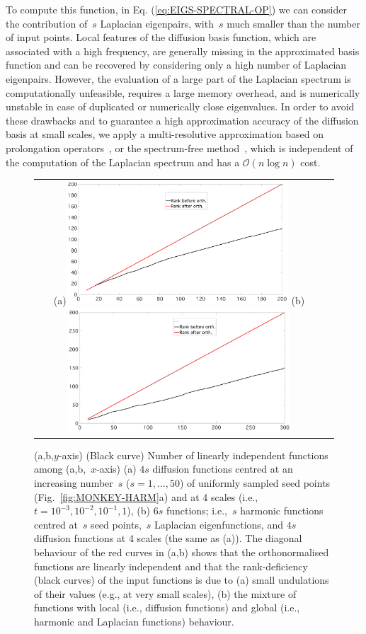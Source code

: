\documentclass[acmtog,authorversion]{acmart}
\begin{document}
To compute this function, in Eq. (\ref{eq:EIGS-SPECTRAL-OP}) we can consider the contribution of~$s$ Laplacian eigenpairs, with~$s$ much smaller than the number of input points. Local features of the diffusion basis function, which are associated with a high frequency, are generally missing in the approximated basis function and can be recovered by considering only a high number of Laplacian eigenpairs. However, the evaluation of a large part of the Laplacian spectrum is computationally unfeasible, requires a large memory overhead, and is numerically unstable in case of duplicated or numerically close eigenvalues. In order to avoid these drawbacks and to guarantee a high approximation accuracy of the diffusion basis at small scales, we apply a multi-resolutive approximation based on prolongation operators~\citep{VAXMAN2010}, or the spectrum-free method~\citep{PATANE-CAGD2013}, which is independent of the computation of the Laplacian spectrum and has a \mbox{$\mathcal{O}(n\log n)$} cost.
%
\begin{figure}[t]
\centering
\begin{tabular}{cc}
(a)\includegraphics[width=235pt]{FMAP-images/monkey-diffusion-seed-rank.jpg}
(b)\includegraphics[width=235pt]{FMAP-images/monkey-diffusion-harmonic-laplacian-rank.jpg}
\end{tabular}
\caption{(a,b,$y$-axis) (Black curve) Number of linearly independent functions among (a,b,~$x$-axis) (a) \mbox{$4s$} diffusion functions centred at an increasing number~$s$ (\mbox{$s=1,\ldots,50$}) of uniformly sampled seed points (Fig.~\ref{fig:MONKEY-HARM}a) and at 4 scales (i.e., \mbox{$t=10^{-3},10^{-2},10^{-1},1$}), (b) \mbox{$6s$} functions; i.e.,~$s$ harmonic functions centred at~$s$ seed points,~$s$ Laplacian eigenfunctions, and \mbox{$4s$} diffusion functions at 4 scales (the same as (a)). The diagonal behaviour of the red curves in (a,b) shows that the orthonormalised functions are linearly independent and that the rank-deficiency (black curves) of the input functions is due to (a) small undulations of their values (e.g., at very small scales), (b) the mixture of functions with local (i.e., diffusion functions) and global (i.e., harmonic and Laplacian functions) behaviour.\label{fig:MONKEY-DIFFUSION-RANK}}
\end{figure}
\end{document}
